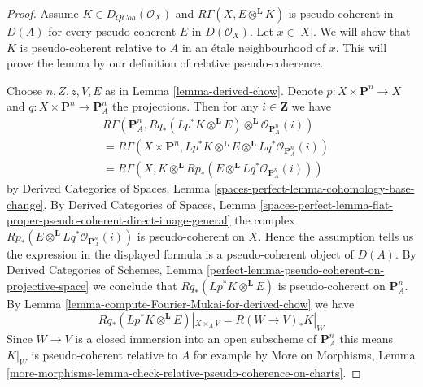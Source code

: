 \documentclass[10pt,a4paper]{amsart}
\theoremstyle{plain}
\theoremstyle{definition}
\theoremstyle{remark}
\numberwithin{equation}{subsection}
\def\QCoh{\mathit{QCoh}}
\begin{document}
\begin{proof}
Assume $K \in D_\QCoh(\mathcal{O}_X)$ and
$R\Gamma(X, E \otimes^\mathbf{L} K)$ is pseudo-coherent
in $D(A)$ for every pseudo-coherent $E$ in $D(\mathcal{O}_X)$.
Let $x \in |X|$. We will show that $K$ is pseudo-coherent relative to $A$
in an \'etale neighbourhood of $x$. This will prove the lemma
by our definition of relative pseudo-coherence.

\medskip\noindent
Choose $n, Z, z, V, E$ as in Lemma \ref{lemma-derived-chow}.
Denote $p : X \times \mathbf{P}^n \to X$ and
$q : X \times \mathbf{P}^n \to \mathbf{P}^n_A$
the projections.
Then for any $i \in \mathbf{Z}$ we have
\begin{align*}
& R\Gamma(\mathbf{P}^n_A,
Rq_*(Lp^*K \otimes^\mathbf{L} E)
\otimes^\mathbf{L}
\mathcal{O}_{\mathbf{P}^n_A}(i)) \\
& =
R\Gamma(X \times \mathbf{P}^n,
Lp^*K \otimes^\mathbf{L} E \otimes^\mathbf{L}
Lq^*\mathcal{O}_{\mathbf{P}^n_A}(i)) \\
& =
R\Gamma(X,
K \otimes^\mathbf{L} Rp_*(E \otimes^\mathbf{L}
Lq^*\mathcal{O}_{\mathbf{P}^n_A}(i)))
\end{align*}
by
Derived Categories of Spaces,
Lemma \ref{spaces-perfect-lemma-cohomology-base-change}.
By
Derived Categories of Spaces, Lemma
\ref{spaces-perfect-lemma-flat-proper-pseudo-coherent-direct-image-general}
the complex $Rp_*(E \otimes^\mathbf{L} Lq^*\mathcal{O}_{\mathbf{P}^n_A}(i))$
is pseudo-coherent on $X$. Hence the assumption tells us the expression
in the displayed formula is a pseudo-coherent object of $D(A)$.
By
Derived Categories of Schemes,
Lemma \ref{perfect-lemma-pseudo-coherent-on-projective-space}
we conclude that $Rq_*(Lp^*K \otimes^\mathbf{L} E)$ is
pseudo-coherent on $\mathbf{P}^n_A$.
By Lemma \ref{lemma-compute-Fourier-Mukai-for-derived-chow}
we have
$$
Rq_*(Lp^*K \otimes^\mathbf{L} E)|_{X \times_A V} =
R(W \to V)_*K|_W
$$
Since $W \to V$ is a closed immersion into an open subscheme of
$\mathbf{P}^n_A$ this means $K|_W$ is pseudo-coherent relative to $A$
for example by
More on Morphisms,
Lemma \ref{more-morphisms-lemma-check-relative-pseudo-coherence-on-charts}.
\end{proof}
\end{document}
